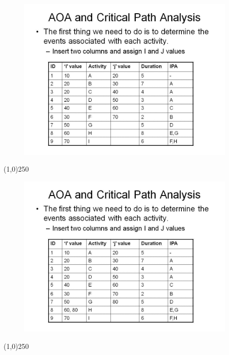\begin{frame}
\begin{figure}
	\centering
		\includegraphics[width = 10.5cm]{oldnotes/Slide74.jpg}
\end{figure}
\end{frame}
\begin{center}\line(1,0){250}\end{center}


\begin{frame}
\begin{figure}
	\centering
		\includegraphics[width = 10.5cm]{oldnotes/Slide75.jpg}
\end{figure}
\end{frame}
\begin{center}\line(1,0){250}\end{center}


